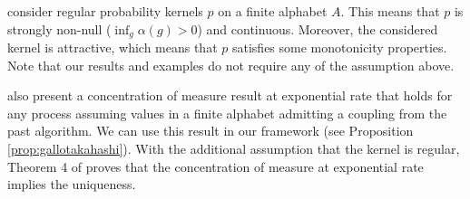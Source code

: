\documentclass[a4paper]{article}
\begin{document}
\fi



\cite{gallotakahashi} consider regular probability kernels $p$ on a finite alphabet $A$. This means that $p$ is strongly non-null ($\inf_{g}\alpha(g)>0$) and continuous. Moreover, the considered kernel is attractive, which means that $p$ satisfies some monotonicity properties. Note that our results and examples do not require any of the assumption above.

\cite{gallotakahashi} also present a concentration of measure result at exponential rate that holds for any process assuming values in a finite alphabet admitting a coupling from the past algorithm. We can use this result in our framework (see Proposition \ref{prop:gallotakahashi}). With the additional assumption that the kernel is regular, Theorem 4 of \cite{gallotakahashi} proves that the concentration of measure at exponential rate implies the uniqueness.

\end{document}
